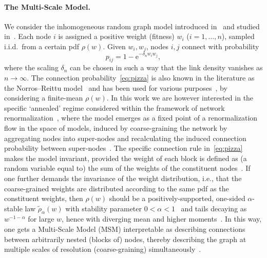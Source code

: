 \documentclass[ twocolumn,
 amsmath,amssymb,
 aps, pre, amsthm, amsfonts,
]{revtex4-2}
\newcommand{\e}{\mathrm{e}}
\begin{document}
\paragraph*{The Multi-Scale Model.}  
We consider the inhomogeneous random graph model introduced in~\cite{garuccio2023multiscale} and studied in~\cite{avena2022inhomogeneous,lalli2024geometry,  catanzaro2025spectra}. 
Each node $i$ is assigned a positive weight (fitness) $w_i$ ($i=1,\ldots, n$), sampled i.i.d.\ from a certain pdf $\rho(w)$. 
Given $w_i,w_j$, nodes $i,j$ connect with probability 
\begin{equation}
    p_{ij}=1-\e^{-\delta_n w_i w_j}, \label{eq:pizza}
\end{equation}
where the scaling $\delta_n$ can be chosen in such a way that the link density vanishes as $n\to\infty$.
The connection probability~\eqref{eq:pizza} is also known in the literature as the Norros–Reittu model~\cite{norros2006conditionally} and has been used for various purposes~\cite{rodgers2005eigenvalue,bhamidi2010scaling}, by considering a finite-mean $\rho(w)$. 
In this work we are however interested in the specific `annealed' regime considered within the framework of network renormalization~\cite{gabrielli2025network}, where the model emerges as a fixed point of a renormalization flow in the space of models, induced by coarse-graining the network by aggregating nodes into super-nodes and recalculating the induced connection probability between super-nodes~\cite{garuccio2023multiscale}. 
The specific connection rule in~\eqref{eq:pizza} makes the model invariant, provided the weight of each block is defined as (a random variable equal to) the sum of the weights of the constituent nodes~\cite{garuccio2023multiscale}. 
If one further demands the invariance of the weight distribution, i.e., that the coarse-grained weights are distributed according to the same pdf as the constituent weights, then $\rho(w)$ should be a positively-supported, one-sided $\alpha$-stable law $\tilde{\rho}_\alpha(w)$ with stability parameter $0<\alpha<1$~\cite{samorodnitsky1994stable,Nola20} and tails decaying as $w^{-1-\alpha}$ for large $w$, hence with diverging mean and higher moments~\cite{garuccio2023multiscale,avena2022inhomogeneous}.
In this way, one gets a Multi-Scale Model (MSM) interpretable as describing connections between arbitrarily nested (blocks of) nodes, thereby describing the graph at multiple scales of resolution (coarse-graining) simultaneously~\cite{garuccio2023multiscale}.
\end{document}

